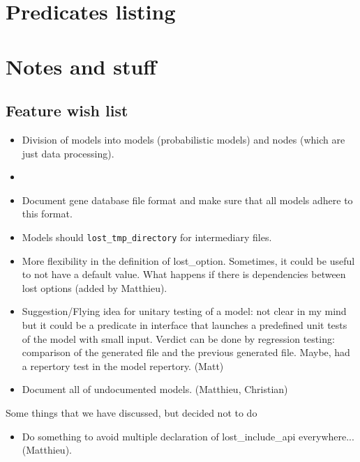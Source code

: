 \documentclass{book}
\begin{document}
\chapter{Predicates listing}

 

\chapter{Notes and stuff}

\section{Feature wish list}

\begin{itemize}

\item Division of models into models (probabilistic models) and nodes
  (which are just data processing).

\item 

\item Document gene database file format and make sure that all models
  adhere to this format.

\item Models should \texttt{lost\_tmp\_directory} for intermediary
  files. 


\item More flexibility in the definition of lost\_option. Sometimes, it could be
useful to not have a default value. What happens if there is dependencies between
lost options (added by Matthieu).

\item Suggestion/Flying idea for unitary testing of a model: not clear in my mind
but it could be a predicate in interface that launches a predefined unit
tests of the model with small input. Verdict can be done by regression testing: 
comparison of the generated file and the previous generated file. Maybe, had
a repertory test in the model repertory. (Matt)
\item Document all of undocumented models. (Matthieu, Christian)

\end{itemize}

Some things that we have discussed, but  decided not to do
\begin{itemize}
\item Do something to avoid multiple declaration of lost\_include\_api
 everywhere... (Matthieu).
\end{itemize}

\printindex
\end{document}

